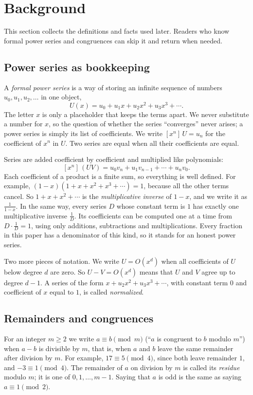 \documentclass[11pt,a4paper]{article}
\theoremstyle{definition}
\theoremstyle{remark}
\newcommand{\coeff}[2]{[x^{#1}]\,#2}
\begin{document}
\section{Background}\label{sec:background}
This section collects the definitions and facts used later. Readers who know formal power series and congruences can skip it and return when needed.
\subsection{Power series as bookkeeping}
A \emph{formal power series} is a way of storing an infinite sequence of numbers $u_0,u_1,u_2,\dots$ in one object,
\[
U(x)=u_0+u_1x+u_2x^2+u_3x^3+\cdots .
\]
The letter $x$ is only a placeholder that keeps the terms apart. We never substitute a number for $x$, so the question
of whether the series ``converges'' never arises; a power series is simply its list of coefficients. We write
$\coeff{n}{U}=u_n$ for the coefficient of $x^n$ in $U$. Two series are equal when all their coefficients are equal.

Series are added coefficient by coefficient and multiplied like polynomials:
\[
\coeff{n}{(UV)}=u_0v_n+u_1v_{n-1}+\cdots+u_nv_0 .
\]
Each coefficient of a product is a finite sum, so everything is well defined. For example,
$(1-x)(1+x+x^2+x^3+\cdots)=1$, because all the other terms cancel. So $1+x+x^2+\cdots$ is the
\emph{multiplicative inverse} of $1-x$, and we write it as $\frac{1}{1-x}$. In the same way, every series $D$ whose
constant term is $1$ has exactly one multiplicative inverse $\frac1D$. Its coefficients can be computed one at a time
from $D\cdot\frac1D=1$, using only additions, subtractions and multiplications. Every fraction in this paper has a
denominator of this kind, so it stands for an honest power series.

Two more pieces of notation. We write $U=O(x^d)$ when all coefficients of $U$ below degree $d$ are zero. So
$U-V=O(x^d)$ means that $U$ and $V$ agree up to degree $d-1$. A series of the form $x+u_2x^2+u_3x^3+\cdots$, with
constant term $0$ and coefficient of $x$ equal to $1$, is called \emph{normalized}.

\subsection{Remainders and congruences}
For an integer $m\ge2$ we write $a\equiv b\pmod m$ (``$a$ is congruent to $b$ modulo $m$'') when $a-b$ is divisible by
$m$, that is, when $a$ and $b$ leave the same remainder after division by $m$. For example, $17\equiv5\pmod 4$, since both leave remainder $1$, and $-3\equiv1\pmod4$. The
remainder of $a$ on division by $m$ is called its \emph{residue} modulo $m$; it is one of $0,1,\dots,m-1$. Saying that
$a$ is odd is the same as saying $a\equiv1\pmod2$.
\end{document}
